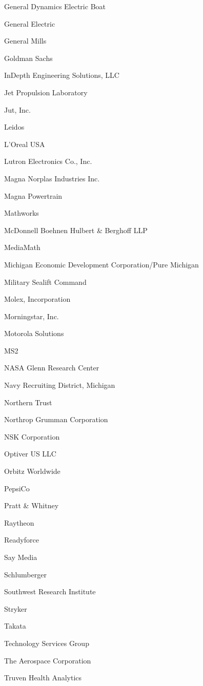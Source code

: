 \documentclass[twoside]{article}
\begin{document}
\begin{center}
\begin{multicols}{5}
\begin{FlushLeft}
\begin{compactitem}
\item General Dynamics Electric Boat
\item General Electric
\item General Mills
\item Goldman Sachs
\item InDepth Engineering Solutions, LLC
\item Jet Propulsion Laboratory
\item Jut, Inc.
\item Leidos
\item L'Oreal USA
\item Lutron Electronics Co., Inc.
\item Magna Norplas Industries Inc.
\item Magna Powertrain
\item Mathworks
\item McDonnell Boehnen Hulbert \& Berghoff LLP
\item MediaMath
\item Michigan Economic Development Corporation/Pure Michigan
\item Military Sealift Command
\item Molex, Incorporation
\item Morningstar, Inc.
\item Motorola Solutions
\item MS2
\item NASA Glenn Research Center
\item Navy Recruiting District, Michigan
\item Northern Trust
\item Northrop Grumman Corporation
\item NSK Corporation
\item Optiver US LLC
\item Orbitz Worldwide
\item PepsiCo
\item Pratt \& Whitney
\item Raytheon
\item Readyforce
\item Say Media
\item Schlumberger
\item Southwest Research Institute
\item Stryker
\item Takata
\item Technology Services Group
\item The Aerospace Corporation
\item Truven Health Analytics

\end{compactitem}
\end{FlushLeft}
\end{multicols}
\end{center}
\end{document}
